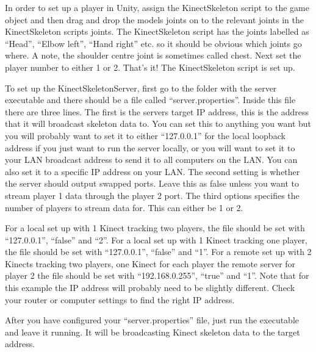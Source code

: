 \documentclass[a4paper,oneside]{memoir}
\begin{document}
			In order to set up a player in Unity, assign the KinectSkeleton script to the game object and then drag and drop the models joints on to the relevant joints in the KinectSkeleton scripts joints. The KinectSkeleton script has the joints labelled as ``Head'', ``Elbow left'', ``Hand right'' etc. so it should be obvious which joints go where. A note, the shoulder centre joint is sometimes called chest. Next set the player number to either 1 or 2. That's it! The KinectSkeleton script is set up.

			To set up the KinectSkeletonServer, first go to the folder with the server executable and there should be a file called ``server.properties''.
			Inside this file there are three lines.
			The first is the servers target IP address, this is the address that it will broadcast skeleton data to.
			You can set this to anything you want but you will probably want to set it to either ``127.0.0.1'' for the local loopback address if you just want to run the server locally, or you will want to set it to your LAN broadcast address to send it to all computers on the LAN.
			You can also set it to a specific IP address on your LAN.
			The second setting is whether the server should output swapped ports.
			Leave this as false unless you want to stream player 1 data through the player 2 port.
			The third options specifies the number of players to stream data for. This can either be 1 or 2.

			For a local set up with 1 Kinect tracking two players, the file should be set with ``127.0.0.1'', ``false'' and ``2''.
			For a local set up with 1 Kinect tracking one player, the file should be set with ``127.0.0.1'', ``false'' and ``1''.
			For a remote set up with 2 Kinects tracking two players, one Kinect for each player the remote server for player 2 the file should be set with ``192.168.0.255'', ``true'' and ``1''. Note that for this example the IP address will probably need to be slightly different. Check your router or computer settings to find the right IP address.

			After you have configured your ``server.properties'' file, just run the executable and leave it running.
			It will be broadcasting Kinect skeleton data to the target address.
\end{document}
